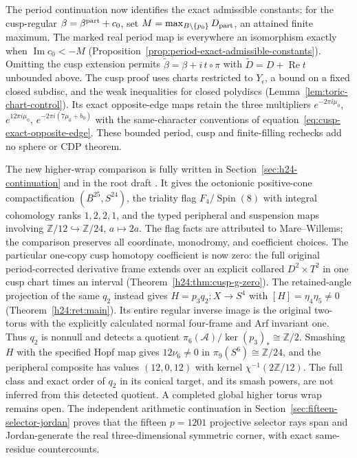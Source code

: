 The period continuation now identifies the exact admissible constants:
for the cusp-regular $\beta=\beta^{\rm part}+c_0$, set
$M=\max_{B\setminus\{p_0\}}D_{\rm part}$, an attained finite maximum.
The marked real period map is everywhere an isomorphism exactly when
$\operatorname{Im}c_0<-M$
(Proposition~\ref{prop:period-exact-admissible-constants}). Omitting the
cusp extension permits $\widetilde\beta=\beta+i\,t\circ\pi$ with
$\widetilde D=D+\operatorname{Re}t$ unbounded above.
The cusp proof uses charts restricted to $Y_\epsilon$, a bound on a
fixed closed subdisc, and the weak inequalities for closed polydiscs
(Lemma~\ref{lem:toric-chart-control}). Its exact opposite-edge maps
retain the three multipliers $e^{-2\pi i\mu_0}$,
$e^{12\pi i\mu_0}$, $e^{-2\pi i(7\mu_0+b_0)}$
with the same-character conventions of
equation~\eqref{eq:cusp-exact-opposite-edge}. These bounded period,
cusp and finite-filling rechecks add no sphere or CDP theorem.

The new higher-wrap comparison is fully written in
Section~\ref{sec:h24-continuation} and in the root draft
. It gives the octonionic
positive-cone compactification $(B^{25},S^{24})$, the triality flag
$F_4/\operatorname{Spin}(8)$ with integral cohomology ranks $1,2,2,1$,
and the typed peripheral and suspension maps involving
$\mathbb Z/12\hookrightarrow\mathbb Z/24$, $a\mapsto2a$.
The flag facts are attributed to Mare--Willems; the comparison preserves
all coordinate, monodromy, and coefficient choices. The particular
one-copy cusp homotopy coefficient is now zero: the full original
period-corrected derivative frame extends over an explicit collared
$D^2\times T^2$ in one cusp chart times an interval
(Theorem~\ref{h24:thm:cusp-g-zero}). The retained-angle projection of
the same $q_2$ instead gives $H=p_3q_2:X\to S^4$ with
$[H]=\eta_4\eta_5\ne0$ (Theorem~\ref{h24:ret:main}). Its entire
regular inverse image is the original two-torus with the explicitly
calculated normal four-frame and Arf invariant one. Thus $q_2$ is
nonnull and detects a quotient $\pi_6(\mathcal A)/\ker(p_3)_*
\cong\mathbb Z/2$. Smashing $H$ with the specified Hopf map gives
$12\nu_6\ne0$ in $\pi_9(S^6)\cong\mathbb Z/24$, and the
peripheral composite has values $(12,0,12)$ with kernel
$\chi^{-1}(2\mathbb Z/12)$. The full class and exact order of
$q_2$ in its conical target, and its smash powers, are not inferred
from this detected quotient. A completed global higher torus
wrap remains open. The independent arithmetic continuation in
Section~\ref{sec:fifteen-selector-jordan} proves that the fifteen
$p=1201$ projective selector rays span and Jordan-generate the real
three-dimensional symmetric corner, with exact same-residue countercounts.

